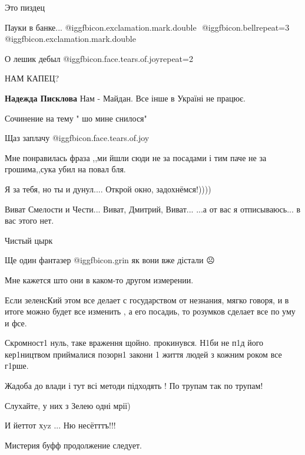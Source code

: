 \begin{itemize}
Это пиздец

Пауки в банке...
@igg{fbicon.exclamation.mark.double}  ️   @igg{fbicon.bell}{repeat=3}   @igg{fbicon.exclamation.mark.double}

О лешик дебыл  @igg{fbicon.face.tears.of.joy}{repeat=2} 

НАМ КАПЕЦ?

\begin{itemize} %
\textbf{Надежда Писклова} Нам - Майдан. Все інше в Україні не працює.
\end{itemize} %

Сочинение на тему " шо мине снилося"

Щаз заплачу  @igg{fbicon.face.tears.of.joy} 

Мне понравилась фраза ,,ми йшли сюди не за посадами і тим паче не за грошима,,сука убил на повал бля.

Я за тебя, но ты и дунул.... Открой окно, задохнёмся!))))

Виват Смелости и Чести... Виват, Дмитрий, Виват...
...а от вас я отписываюсь... в вас этого нет.

Чистый цырк

Ще один фантазер  @igg{fbicon.grin}  як вони вже дістали ☹️

Мне кажется што они в каком-то другом измерении.


Если зеленсКий этом все делает с государством от незнания, мягко говоря, и в
итоге можно будет все изменить , а его посадиь, то розумков сделает все по уму
и фсе.


Скромност1 нуль, таке враження щойно. прокинувся. Н1би не п1д його кер1ництвом
приймалися позорн1 закони 1 життя людей з кожним роком все г1рше.

Жадоба до влади і тут всі методи підходять ! По трупам так по трупам!

Слухайте, у них з Зелею одні мрії)

И йеттот хyz ... Ню несётттъ!!!

Мистерия буфф продолжение следует.


\end{itemize}
